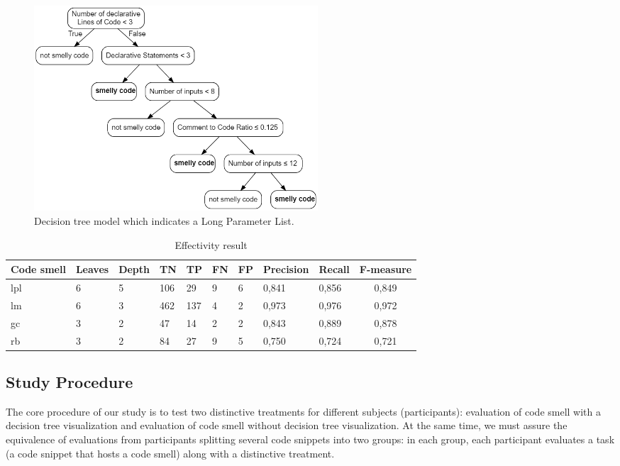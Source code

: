 \begin{figure}[t]
\includegraphics[width=400px]{figures/lpl_detection.png}
\caption{Decision tree model which indicates a Long Parameter List.}
\label{fig:lpl_detecion}
\end{figure}

\begin{table}[t]
\centering
\begin{tabular}{lllllllllc}
\toprule
\textbf{Code smell} &   \textbf{Leaves}    & \textbf{Depth} & \textbf{TN} & \textbf{TP} & \textbf{FN} & \textbf{FP} & \textbf{Precision} & \textbf{Recall} & \textbf{F-measure} \\ 
\toprule
lpl & 6 & 5 & 106 & 29  & 9 & 6 & 0,841 & 0,856 & 0,849  \\
lm  & 6 & 3 & 462 & 137 & 4 & 2 & 0,973 & 0,976 & 0,972  \\
gc  & 3 & 2 & 47  & 14  & 2 & 2 & 0,843 & 0,889 & 0,878  \\
rb  & 3 & 2 & 84  & 27  & 9 & 5 & 0,750 & 0,724 & 0,721 \\
\bottomrule
\end{tabular}
\caption{Effectivity result}
\label{tbl:effectivityTable}
\end{table}

\subsection{Study Procedure} \label{sec:studyProcedure}

The core procedure of our study is to test two distinctive treatments for different subjects (participants): evaluation of code smell with a decision tree visualization and evaluation of code smell without decision tree visualization. At the same time, we must assure the equivalence of evaluations from participants splitting several code snippets into two groups: in each group, each participant evaluates a task (a code snippet that hosts a code smell) along with a distinctive treatment.

